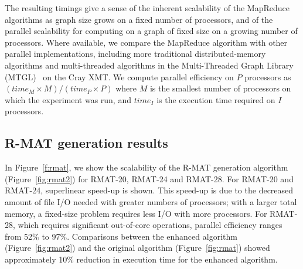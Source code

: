 The resulting timings give a sense of the inherent scalability of the
MapReduce algorithms as graph size grows on a fixed number of
processors, and of the parallel scalability for computing on a graph
of fixed size on a growing number of processors.  Where available, we
compare the MapReduce algorithm with other parallel implementations,
including more traditional distributed-memory algorithms and
multi-threaded algorithms in the Multi-Threaded Graph Library
(MTGL)~\cite{MTGL} on the Cray XMT.  We compute parallel efficiency on
$P$ processors as $({time}_{M} \times M) / ({time}_P \times P)$ where
$M$ is the smallest number of processors on which the experiment was
run, and ${time}_I$ is the execution time required on $I$ processors.

\subsection{R-MAT generation results}

In Figure~\ref{f:rmat}, we show the scalability of the R-MAT
generation algorithm (Figure~\ref{fig:rmat2}) for RMAT-20, RMAT-24 and
RMAT-28.  For RMAT-20 and RMAT-24, superlinear speed-up is shown.
This speed-up is due to the decreased amount of file I/O needed with
greater numbers of processors; with a larger total memory, a
fixed-size problem requires less I/O with more processors.  For
RMAT-28, which requires significant out-of-core operations, parallel
efficiency ranges from 52\% to 97\%.  Comparisons between the enhanced
algorithm (Figure~\ref{fig:rmat2}) and the original algorithm
(Figure~\ref{fig:rmat}) showed approximately 10\% reduction in
execution time for the enhanced algorithm.


